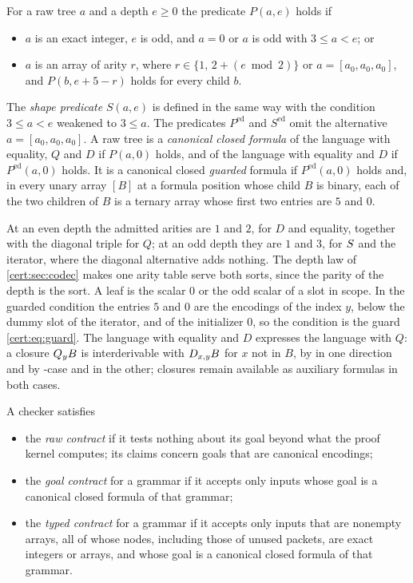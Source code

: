 \begin{definition}\label{cert:def:public}
For a raw tree $a$ and a depth $e\ge 0$ the predicate $P(a,e)$ holds if
\begin{itemize}
\item $a$ is an exact integer, $e$ is odd, and $a=0$ or $a$ is odd with
$3\le a<e$; or
\item $a$ is an array of arity $r$, where $r\in\{1,\,2+(e\bmod 2)\}$ or
$a=[a_0,a_0,a_0]$, and $P(b,e+5-r)$ holds for every child $b$.
\end{itemize}
The \emph{shape predicate} $S(a,e)$ is defined in the same way with the
condition $3\le a<e$ weakened to $3\le a$. The predicates $P^{\mathrm{ed}}$
and $S^{\mathrm{ed}}$ omit the alternative $a=[a_0,a_0,a_0]$. A raw tree is a
\emph{canonical closed formula} of the language with equality, $Q$ and
$D$ if $P(a,0)$ holds, and of the language with equality and $D$ if
$P^{\mathrm{ed}}(a,0)$ holds. It is a canonical closed \emph{guarded} formula
if $P^{\mathrm{ed}}(a,0)$ holds and, in every unary array $[B]$ at a formula
position whose child $B$ is binary, each of the two children of $B$ is a
ternary array whose first two entries are $5$ and $0$.
\end{definition}

At an even depth the admitted arities are $1$ and $2$, for $D$ and
equality, together with the diagonal triple for $Q$; at an odd depth they
are $1$ and $3$, for $S$ and the iterator, where the diagonal alternative
adds nothing. The depth law of \cref{cert:sec:codec} makes one arity table
serve both sorts, since the parity of the depth is the sort. A leaf is the
scalar $0$ or the odd scalar of a slot in scope. In the guarded condition the
entries $5$ and $0$ are the encodings of the index $y$, below the dummy slot
of the iterator, and of the initializer $0$, so the condition is the guard
\eqref{cert:eq:guard}. The language with equality and $D$ expresses the
language with $Q$: a closure $Q_{y}B$ is interderivable with $D_{x,y}B$
for $x$ not in $B$, by  in one direction and by
-case and  in the other; closures remain available
as auxiliary formulas in both cases.

\begin{definition}\label{cert:def:contracts}
A checker satisfies
\begin{itemize}
\item the \emph{raw contract} if it tests nothing about its goal beyond what
the proof kernel computes; its claims concern goals that are canonical
encodings;
\item the \emph{goal contract} for a grammar if it accepts only inputs whose
goal is a canonical closed formula of that grammar;
\item the \emph{typed contract} for a grammar if it accepts only inputs that
are nonempty arrays, all of whose nodes, including those of unused packets,
are exact integers or arrays, and whose goal is a canonical closed formula of
that grammar.
\end{itemize}
\end{definition}

